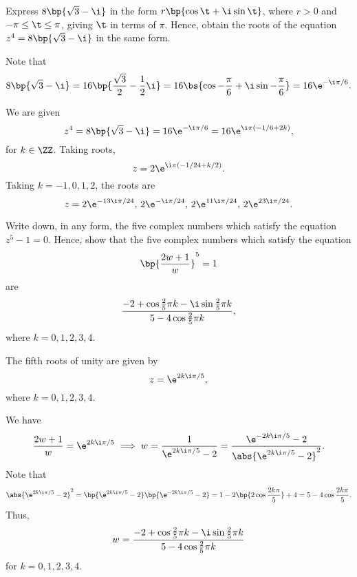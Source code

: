 \begin{problem}
    Express $8\bp{\sqrt3 - \i}$ in the form $r\bp{\cos \t + \i \sin \t}$, where $r > 0$ and $-\pi \leq \t \leq \pi$, giving $\t$ in terms of $\pi$. Hence, obtain the roots of the equation $z^4 = 8\bp{\sqrt3 - \i}$ in the same form.
\end{problem}
\begin{solution}
    Note that \[8\bp{\sqrt 3 - \i} = 16 \bp{\frac{\sqrt3}{2} - \frac12 \i} = 16 \bs{\cos{-\frac\pi6} + \i \sin{-\frac\pi6}} = 16 \e^{-\i \pi/6}.\] 

    We are given \[z^4 = 8\bp{\sqrt3 - \i} = 16 \e^{-\i \pi/6} = 16\e^{\i \pi (-1/6 + 2k)},\] for $k \in \ZZ$. Taking roots, \[z = 2 \e^{\i \pi (-1/24 + k/2)}.\] Taking $k = -1, 0, 1, 2$, the roots are \[z = 2\e^{-13\i\pi/24}, \, 2\e^{-\i\pi/24}, \, 2\e^{11\i\pi/24}, \, 2\e^{23\i\pi/24}.\]
\end{solution}

\begin{problem}
    Write down, in any form, the five complex numbers which satisfy the equation $z^5 - 1 = 0$. Hence, show that the five complex numbers which satisfy the equation \[\bp{\frac{2w + 1}{w}}^5 = 1\] are \[\frac{-2 + \cos{\frac25 \pi k} - \i \sin{\frac25 \pi k}}{5 - 4 \cos{\frac25 \pi k}},\] where $k = 0, 1, 2, 3, 4$.
\end{problem}
\begin{solution}
    The fifth roots of unity are given by \[z = \e^{2k \i \pi /5},\] where $k = 0, 1, 2, 3, 4$.

    We have \[\frac{2w + 1}{w} = \e^{2k \i \pi /5} \implies w = \frac1{\e^{2k \i \pi /5} - 2} = \frac{\e^{-2k \i \pi /5} - 2}{\abs{\e^{2k \i \pi /5} - 2}^2}.\] Note that \[\abs{\e^{2k \i \pi /5} - 2}^2 = \bp{\e^{2k \i \pi /5} - 2}\bp{\e^{-2k \i \pi /5} - 2} = 1 - 2\bp{2\cos \frac{2k\pi}{5}} + 4 = 5 - 4\cos \frac{2k\pi}5.\] Thus, \[w = \frac{-2 + \cos{\frac25 \pi k} - \i \sin{\frac25 \pi k}}{5 - 4 \cos{\frac25 \pi k}}\] for $k = 0, 1, 2, 3, 4$.
\end{solution}


